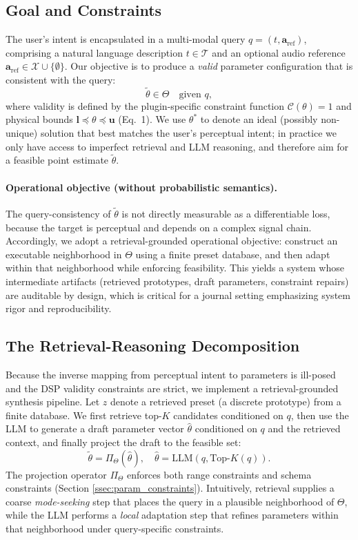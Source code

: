 \documentclass{article}
\begin{document}
\subsection{Goal and Constraints}
The user's intent is encapsulated in a multi-modal query $q = (t, \mathbf{a}_{\text{ref}})$, comprising a natural language description $t \in \mathcal{T}$ and an optional audio reference $\mathbf{a}_{\text{ref}} \in \mathcal{X} \cup \{\emptyset\}$. Our objective is to produce a \emph{valid} parameter configuration that is consistent with the query:
\begin{equation}
	\tilde{\theta} \in \Theta \quad \text{given } q,
\end{equation}
where validity is defined by the plugin-specific constraint function $\mathcal{C}(\theta)=1$ and physical bounds $\mathbf{l} \preceq \theta \preceq \mathbf{u}$ (Eq.~1). We use $\theta^*$ to denote an ideal (possibly non-unique) solution that best matches the user's perceptual intent; in practice we only have access to imperfect retrieval and LLM reasoning, and therefore aim for a feasible point estimate $\tilde{\theta}$.

\paragraph{Operational objective (without probabilistic semantics).}
The query-consistency of $\tilde{\theta}$ is not directly measurable as a differentiable loss, because the target is perceptual and depends on a complex signal chain. Accordingly, we adopt a retrieval-grounded operational objective: construct an executable neighborhood in $\Theta$ using a finite preset database, and then adapt within that neighborhood while enforcing feasibility. This yields a system whose intermediate artifacts (retrieved prototypes, draft parameters, constraint repairs) are auditable by design, which is critical for a journal setting emphasizing system rigor and reproducibility.

\subsection{The Retrieval-Reasoning Decomposition}
Because the inverse mapping from perceptual intent to parameters is ill-posed and the DSP validity constraints are strict, we implement a retrieval-grounded synthesis pipeline. Let $z$ denote a retrieved preset (a discrete prototype) from a finite database. We first retrieve top-$K$ candidates conditioned on $q$, then use the LLM to generate a draft parameter vector $\hat{\theta}$ conditioned on $q$ and the retrieved context, and finally project the draft to the feasible set:
\begin{equation}
	\tilde{\theta} = \Pi_{\Theta}\left(\hat{\theta}\right), \quad \hat{\theta} = \text{LLM}\left(q, \text{Top-}K(q)\right).
\end{equation}
The projection operator $\Pi_{\Theta}$ enforces both range constraints and schema constraints (Section \ref{ssec:param_constraints}).
Intuitively, retrieval supplies a coarse \textit{mode-seeking} step that places the query in a plausible neighborhood of $\Theta$, while the LLM performs a \textit{local} adaptation step that refines parameters within that neighborhood under query-specific constraints.
\end{document}
